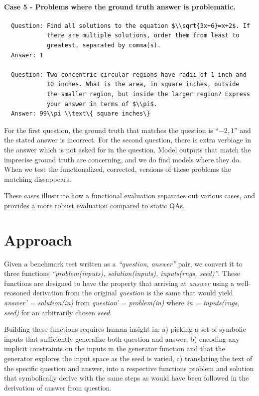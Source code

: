 \documentclass[11pt,a4paper]{article}
\begin{document}
\paragraph{Case 5 - Problems where the ground truth answer is problematic.}
\begin{verbatim}
  Question: Find all solutions to the equation $\\sqrt{3x+6}=x+2$. If
            there are multiple solutions, order them from least to
            greatest, separated by comma(s).
  Answer: 1

  Question: Two concentric circular regions have radii of 1 inch and
            10 inches. What is the area, in square inches, outside
            the smaller region, but inside the larger region? Express
            your answer in terms of $\\pi$.
  Answer: 99\\pi \\text\{ square inches\}
\end{verbatim}
For the first question, the ground truth that matches the question is ``$-2,1$''
and the stated answer is incorrect. 
For the second question, there is extra verbiage in the answer which is not asked
for in the question.
Model outputs that match the imprecise ground truth are concerning, and we do find
models where they do. When we test the functionalized, corrected, versions of these
problems the matching dissappears.

These cases illustrate how a functional evaluation separates out various cases,
and provides a more robust evaluation compared to static QAs.

\section{Approach}

Given a benchmark test written as a {\em ``question, answer''} pair, we convert
it to three functions {\em ``problem(inputs), solution(inputs), inputs(rngs,
seed)''}.  These functions are designed to have the property that arriving at
{\em answer} using a well-reasoned derivation from the original {\em question}
is the same that would yield {\em answer' = solution(in)} from {\em question' =
problem(in)} where {\em in = inputs(rngs, seed)} for an arbitrarily chosen {\em
seed}.

Building these functions requires human insight in: a) picking a set of
symbolic inputs that sufficiently generalize both question and answer, b)
encoding any implicit constraints on the inputs in the generator function and
that the generator explores the input space as the seed is varied, c)
translating the text of the specific question and answer, into a respective
functions problem and solution that symbolically derive with the same
steps as would have been followed in the derivation of answer from question.
\end{document}
